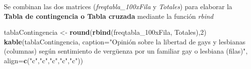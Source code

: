 \documentclass[
  12 pt,
  a4paper,
]{article}
\newenvironment{Shaded}{\begin{snugshade}}{\end{snugshade}}
\newcommand{\AttributeTok}[1]{\textcolor[rgb]{0.13,0.29,0.53}{#1}}
\newcommand{\DecValTok}[1]{\textcolor[rgb]{0.00,0.00,0.81}{#1}}
\newcommand{\FunctionTok}[1]{\textcolor[rgb]{0.13,0.29,0.53}{\textbf{#1}}}
\newcommand{\NormalTok}[1]{#1}
\newcommand{\OtherTok}[1]{\textcolor[rgb]{0.56,0.35,0.01}{#1}}
\newcommand{\StringTok}[1]{\textcolor[rgb]{0.31,0.60,0.02}{#1}}
\begin{document}
Se combinan las dos matrices (\emph{freqtabla\_100xFila} y
\emph{Totales}) para elaborar la \textbf{Tabla de contingencia o Tabla
cruzada} mediante la función \emph{rbind}

\begin{Shaded}
\begin{Highlighting}[]
\NormalTok{tablaContingencia }\OtherTok{\textless{}{-}} \FunctionTok{round}\NormalTok{(}\FunctionTok{rbind}\NormalTok{(freqtabla\_100xFila, Totales),}\DecValTok{2}\NormalTok{)}
\FunctionTok{kable}\NormalTok{(tablaContingencia, }
\AttributeTok{caption=}\StringTok{"Opinión sobre la libertad de gays y lesbianas (columnas)}
\StringTok{según sentimiento de vergüenza por un familiar gay o lesbiana (filas)"}\NormalTok{,}
\AttributeTok{align=}\FunctionTok{c}\NormalTok{(}\StringTok{"c"}\NormalTok{,}\StringTok{"c"}\NormalTok{,}\StringTok{"c"}\NormalTok{,}\StringTok{"c"}\NormalTok{,}\StringTok{"c"}\NormalTok{))}
\end{Highlighting}
\end{Shaded}
\end{document}
